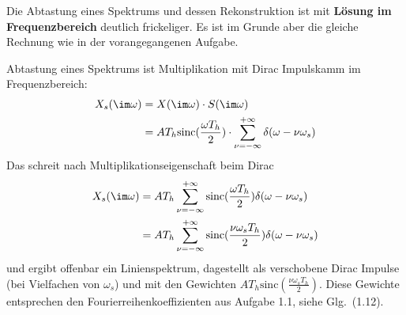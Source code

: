 \begin{Loesung}
\begin{center}
\end{center}
%
%
%

Die Abtastung eines Spektrums und dessen Rekonstruktion ist mit
\textbf{Lösung im Frequenzbereich} deutlich frickeliger.
Es ist im Grunde aber die gleiche Rechnung wie in der vorangegangenen Aufgabe.

Abtastung eines Spektrums ist Multiplikation mit Dirac Impulskamm im Frequenzbereich:
\begin{align}
X_s(\im\omega)
&= X(\im\omega) \cdot S(\im\omega)\\
&= A T_h\mathrm{sinc}(\frac{\omega T_h}{2}) \cdot \sum_{\nu=-\infty}^{+\infty} \delta(\omega-\nu \omega_s)
\end{align}
Das schreit nach Multiplikationseigenschaft beim Dirac
\begin{align}
X_s(\im\omega)
&= A T_h \sum_{\nu=-\infty}^{+\infty} \mathrm{sinc}(\frac{\omega T_h}{2}) \delta(\omega-\nu \omega_s)\\
&= A T_h \sum_{\nu=-\infty}^{+\infty} \mathrm{sinc}(\frac{\nu \omega_s T_h}{2}) \delta(\omega-\nu \omega_s)
\end{align}
und ergibt offenbar ein Linienspektrum, dagestellt als verschobene Dirac Impulse (bei Vielfachen von $\omega_s$)
und mit den Gewichten $A T_h \mathrm{sinc}(\frac{\nu \omega_s T_h}{2})$. Diese Gewichte
entsprechen den Fourierreihenkoeffizienten aus Aufgabe 1.1, siehe Glg.~(1.12).


\end{Loesung}
